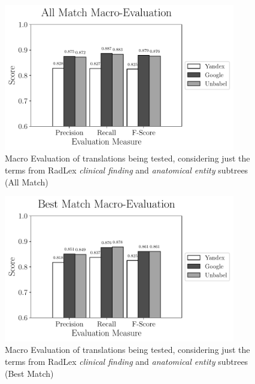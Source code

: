 \begin{figure}[ht]
	\centering
	\includegraphics[width=0.9\textwidth]{SupportFiles/plots/all_match_macro_clinical_anatomical_subtrees_plot.pdf}
	\caption{Macro Evaluation of translations being tested, considering just the terms from RadLex \textit{clinical finding} and \textit{anatomical entity} subtrees (All Match)}
	\label{app:macro_eval_subtrees_all}
\end{figure}


\begin{figure}[ht]
	\centering
	\includegraphics[width=0.9\textwidth]{SupportFiles/plots/best_match_macro_clinical_anatomical_subtrees_plot.pdf}
	\caption{Macro Evaluation of translations being tested, considering just the terms from RadLex \textit{clinical finding} and \textit{anatomical entity} subtrees (Best Match)}
	\label{app:macro_eval_subtrees_best}
\end{figure}



